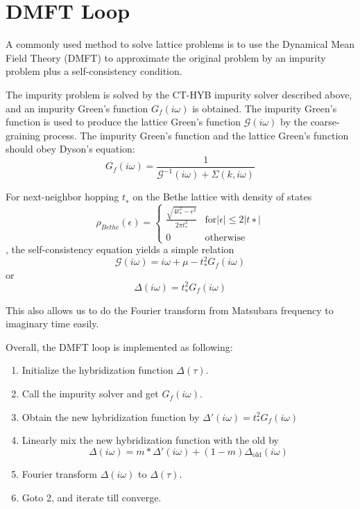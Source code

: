 \section{DMFT Loop}

A commonly used method to solve lattice problems is to use the Dynamical Mean
Field Theory (DMFT) to approximate the original problem by an impurity problem
plus a self-consistency condition.

The impurity problem is solved by the 
CT-HYB impurity solver described above, and an impurity Green's function 
$G_f(i\omega)$
is obtained. The impurity Green's function is used to produce the lattice
Green's function $\mathcal{G}(i\omega)$ by the coarse-graining process.
The impurity Green's function and the lattice Green's function should obey 
Dyson's equation:
\begin{equation}
  \label{eq:3}
  G_f(i\omega)=\frac{1}{\mathcal{G}^{-1}(i\omega)+\Sigma(k,i\omega)}
\end{equation}

For next-neighbor hopping $t_∗$ on the Bethe lattice with density of states 
\begin{equation}
  \label{eq:bethe_dos}
  \rho_{Bethe}(\epsilon)=\left\{
    \begin{array}{ll}
      \frac{\sqrt{4t_*^2-\epsilon^2}}{2\pi t_*^2}&\mathrm{for} |\epsilon|\leq 2|t∗|  \\
      0&\mathrm{otherwise}
    \end{array}
  \right.
\end{equation}
,
the self-consistency equation yields a simple relation
\begin{equation}
  \label{eq:5}
  \mathcal{G}(i\omega)=i\omega+\mu-t_*^2G_f(i\omega)
\end{equation}
or 
\begin{equation}
  \label{eq:6}
  \Delta(i\omega)=t_*^2G_f(i\omega)
\end{equation}

This also allows us to do the Fourier transform from Matsubara frequency to imaginary
time easily. 

Overall, the DMFT loop is implemented as following:
\begin{enumerate}
\item Initialize the hybridization function $\Delta(\tau)$.
\item Call the impurity solver and get $G_f(i\omega)$.
\item Obtain the new hybridization function by $\Delta'(i\omega)=t_*^2G_f(i\omega)$
\item Linearly mix the new hybridization function with the old 
  by 
  \begin{equation}
    \label{eq:7}
    \Delta(i\omega) = m * \Delta'(i\omega)+ (1-m) \Delta_\mathrm{old}(i\omega)    
  \end{equation}
\item Fourier transform $\Delta(i\omega)$ to $\Delta(\tau)$.
\item Goto 2, and iterate till converge.

\end{enumerate}

